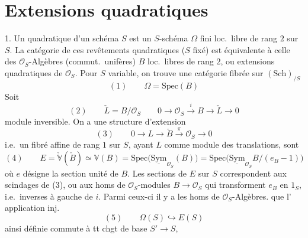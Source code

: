 \documentclass[11pt,a4paper]{article}
\begin{document}
\section*{Extensions quadratiques}


1. Un \struck{\ill{}}  quadratique d'un schéma $S$ est un $S$-schéma $\Omega$ fini loc.\ libre de rang $2$ sur $S$. La catégorie de ces revêtements quadratiques ($S$ fixé) est équivalente à celle des $\mathcal{O}_S$-Algèbres (commut.\ unifères) $B$ loc.\ libres de rang $2$, ou extensions quadratiques  de $\mathcal{O}_S$. Pour $S$ variable, on trouve une catégorie fibrée sur $(\mathrm{Sch})_{/S}$
\[
(1)\qquad \Omega = \mathrm{Spec}(B)
\]
Soit \struck{\ill{}}
\[
(2)\qquad \check{L} = B/\mathcal{O}_S \qquad 0 \to \mathcal{O}_S \xrightarrow{\;i\;} B \to \check{L} \to 0
\]
module inversible. On a une structure d'extension
\[
(3)\qquad 0 \to L \to \check{B} \xrightarrow{\;\pi\;} \mathcal{O}_S \to 0
\]
i.e.\ un fibré affine de rang $1$ sur $S$, ayant $L$ comme module des translations,   sont
\[
(4)\qquad E = \check{\mathbb{V}}(\check{B}) \simeq \mathbb{V}(B) = \mathrm{Spec}\bigl(\underline{\mathrm{Sym}}_{\mathcal{O}_S}(B)\bigr)
= \mathrm{Spec}\bigl(\underline{\mathrm{Sym}}_{\mathcal{O}_S} B/(e_B - 1)\bigr)
\]
où $e$ désigne la section unité de $B$. Les sections de $E$ sur $S$ correspondent aux scindages de (3), ou aux homs de $\mathcal{O}_S$-modules $B \to \mathcal{O}_S$ qui transforment $e_B$ en $1_S$, i.e.\ inverses à gauche de $i$. Parmi ceux-ci il y a les  homs de $\mathcal{O}_S$-Algèbres.  \ill{} que l'\struck{\ill{}} application inj.
\[
(5)\qquad \Omega(S) \hookrightarrow E(S)
\]
ainsi définie commute à tt chgt de base $S' \to S$,
\end{document}
